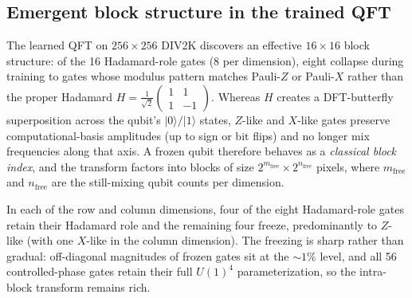 \documentclass[a4paper, twocolumn]{quantumarticle}
\begin{document}
\subsection{Emergent block structure in the trained QFT}
\label{sec:emergence}

The learned QFT on $256 \times 256$ DIV2K discovers an effective $16 \times 16$ block structure: of the 16 Hadamard-role gates (8 per dimension), eight collapse during training to gates whose modulus pattern matches Pauli-$Z$ or Pauli-$X$ rather than the proper Hadamard $H = \tfrac{1}{\sqrt{2}}\!\begin{pmatrix}1 & 1 \\ 1 & -1\end{pmatrix}$.
Whereas $H$ creates a DFT-butterfly superposition across the qubit's $|0\rangle / |1\rangle$ states, $Z$-like and $X$-like gates preserve computational-basis amplitudes (up to sign or bit flips) and no longer mix frequencies along that axis.
A frozen qubit therefore behaves as a \emph{classical block index}, and the transform factors into blocks of size $2^{m_{\mathrm{free}}} \times 2^{n_{\mathrm{free}}}$ pixels, where $m_{\mathrm{free}}$ and $n_{\mathrm{free}}$ are the still-mixing qubit counts per dimension.

In each of the row and column dimensions, four of the eight Hadamard-role gates retain their Hadamard role and the remaining four freeze, predominantly to $Z$-like (with one $X$-like in the column dimension).
The freezing is sharp rather than gradual: off-diagonal magnitudes of frozen gates sit at the ${\sim}1\%$ level, and all 56 controlled-phase gates retain their full $U(1)^4$ parameterization, so the intra-block transform remains rich.
\end{document}
